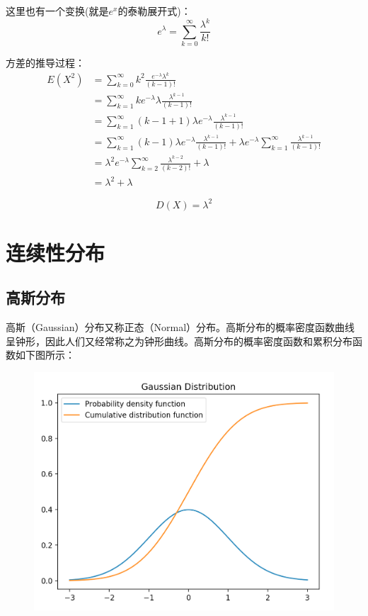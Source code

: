 \documentclass[12pt]{article}
\begin{document}
这里也有一个变换(就是$e^x$的泰勒展开式)：
$$
e^{\lambda} = \sum_{k=0}^{\infty}\frac{\lambda^k}{k!}
$$

方差的推导过程：
\begin{align*}
E(X^2) &= \sum_{k=0}^{\infty}k^2\frac{e^{-\lambda}\lambda^{k}}{(k-1)!} \\
&= \sum_{k=1}^{\infty}k e^{-\lambda}\lambda \frac{\lambda^{k-1}}{(k-1)!} \\
&= \sum_{k=1}^{\infty}(k-1+1) \lambda e^{-\lambda} \frac{\lambda^{k-1}}{(k-1)!} \\
&= \sum_{k=1}^{\infty}(k-1) \lambda e^{-\lambda} \frac{\lambda^{k-1}}{(k-1)!} + \lambda e^{-\lambda} \sum_{k=1}^{\infty}\frac{\lambda^{k-1}}{(k-1)!} \\
&= \lambda^2 e^{-\lambda} \sum_{k=2}^{\infty}\frac{\lambda^{k-2}}{(k-2)!} + \lambda \\
&= \lambda^2 + \lambda
\end{align*} 

$$
D(X) = \lambda^2
$$

\section{连续性分布\cite{Continuous_Variable_Expection_Variation}}
\subsection{高斯分布}
高斯（Gaussian）分布又称正态（Normal）分布。高斯分布的概率密度函数曲线呈钟形，因此人们又经常称之为钟形曲线。高斯分布的概率密度函数和累积分布函数如下图所示：
\begin{figure}[H]
  \centering
  \includegraphics[width=.8\textwidth]{fig/norm_dist.png} 
\end{figure}
\end{document}
